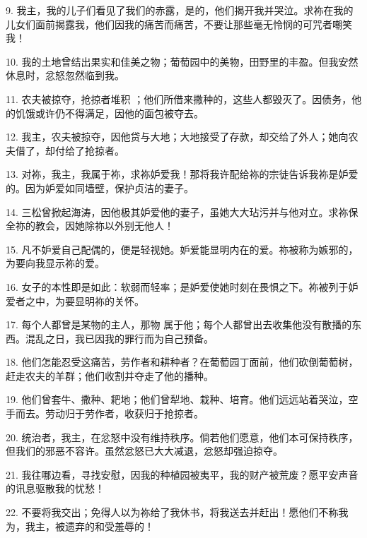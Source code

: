 9. 我主，我的儿子们看见了我们的赤露，是的，他们揭开我并哭泣。求祢在我的儿女们面前揭露我，他们因我的痛苦而痛苦，不要让那些毫无怜悯的可咒者嘲笑我！\par

10. 我的土地曾结出果实和佳美之物；葡萄园中的美物，田野里的丰盈。但我安然休息时，忿怒忽然临到我。\par

11. 农夫被掠夺，抢掠者堆积 ；他们所借来撒种的，这些人都毁灭了。因债务，他的饥饿或许仍不得满足，因他的面包被夺去。\par

12. 我主，农夫被掠夺，因他贷与大地；大地接受了存款，却交给了外人；她向农夫借了，却付给了抢掠者。\par

13. 对祢，我主，我属于祢，求祢妒爱我！那将我许配给祢的宗徒告诉我祢是妒爱的。因为妒爱如同墙壁，保护贞洁的妻子。\par

14. 三松曾掀起海涛，因他极其妒爱他的妻子，虽她大大玷污并与他对立。求祢保全祢的教会，因她除祢以外别无他人！\par

15. 凡不妒爱自己配偶的，便是轻视她。妒爱能显明内在的爱。祢被称为嫉邪的，为要向我显示祢的爱。\par

16. 女子的本性即是如此：软弱而轻率；是妒爱使她时刻在畏惧之下。祢被列于妒爱者之中，为要显明祢的关怀。\par

17. 每个人都曾是某物的主人，那物 属于他；每个人都曾出去收集他没有散播的东西。混乱之日，我已因我的罪行而为自己预备。\par

18. 他们怎能忍受这痛苦，劳作者和耕种者？在葡萄园丁面前，他们砍倒葡萄树，赶走农夫的羊群；他们收割并夺走了他的播种。\par

19. 他们曾套牛、撒种、耙地；他们曾犁地、栽种、培育。他们远远站着哭泣，空手而去。劳动归于劳作者，收获归于抢掠者。\par

20. 统治者，我主，在忿怒中没有维持秩序。倘若他们愿意，他们本可保持秩序，但我们的邪恶不容许。虽然忿怒已大大减退，忿怒却强迫掠夺。\par

21. 我往哪边看，寻找安慰，因我的种植园被夷平，我的财产被荒废？愿平安声音的讯息驱散我的忧愁！\par

22. 不要将我交出；免得人以为祢给了我休书，将我送去并赶出！愿他们不称我为，我主，被遗弃的和受羞辱的！\par

